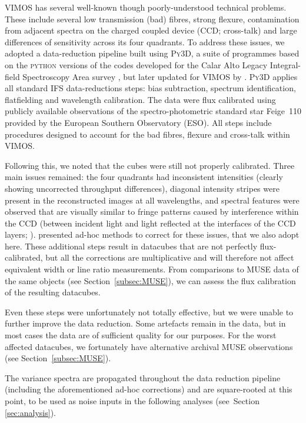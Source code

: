 \documentclass[a4paper,fleqn,usenatbib]{mnras}
\begin{document}
VIMOS has several well-known though poorly-understood technical
problems. These include several low transmission (bad) fibres, strong
flexure, contamination from adjacent spectra on the charged coupled
device (CCD; cross-talk) and large differences of sensitivity across
its four quadrants. To address these issues, we adopted a
data-reduction pipeline built using \textsc{Py3D}, a suite of
programmes based on the \textsc{python} versions of the codes
developed for the Calar Alto Legacy Integral-field Spectroscopy Area
survey \citep[CALIFA;][]{Sanchez2012, Husemann2013}, but later updated
for VIMOS by \citet{Husemann2014}. \textsc{Py3D} applies all standard
IFS data-reductions steps: bias subtraction, spectrum identification,
flatfielding and wavelength calibration. The data were flux calibrated
using publicly available observations of the spectro-photometric
standard star Feige~110 provided by the European Southern Observatory
(ESO). All steps include procedures designed to account for the bad
fibres, flexure and cross-talk within VIMOS.

Following this, we noted that the cubes were still not properly
calibrated. Three main issues remained: the four quadrants had
inconsistent intensities (clearly showing uncorrected throughput
differences), diagonal intensity stripes were present in the
reconstructed images at all wavelengths, and spectral features were
observed that are visually similar to fringe patterns caused by
interference within the CCD (between incident light and light
reflected at the interfaces of the CCD layers;
\citealt{Jullo2008}). \citet{Lagerholm2012} presented ad-hoc methods
to correct for these issues, that we also adopt here. These additional
steps result in datacubes that are not perfectly flux-calibrated, but
all the corrections are multiplicative and will therefore not affect
equivalent width or line ratio measurements. From comparisons to MUSE
data of the same objects (see Section~\ref{subsec:MUSE}), we can
assess the flux calibration of the resulting datacubes.

Even these steps were unfortunately not totally effective, but we were
unable to further improve the data reduction. Some artefacts remain in
the data, but in most cases the data are of sufficient quality for our
purposes. For the worst affected datacubes, we fortunately have
alternative archival MUSE observations (see
Section~\ref{subsec:MUSE}).

The variance spectra are propagated throughout the data reduction
pipeline (including the aforementioned ad-hoc corrections) and are
square-rooted at this point, to be used as noise inputs in the
following analyses (see~Section \ref{sec:analysis}).
\end{document}
